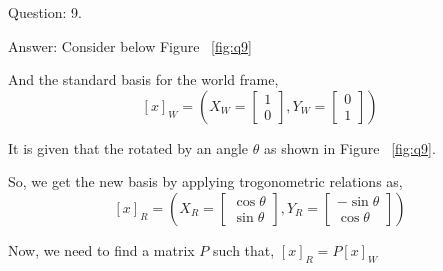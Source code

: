 \documentclass[a4paper]{article}
\begin{document}
\begin{qalist}
		\item[Question: 9.] \setcounter{equation}{0} 
		\item[Answer:]
			Consider below Figure ~\ref{fig:q9} \\
			\begin{minipage}{\linewidth}
				\vspace{0.5cm}
				\centering
				\label{fig:q9}
				\vspace{0.5cm}
			\end{minipage}
			And the standard basis for the world frame, 
			\begin{equation} {[x]}_{W} = 
				\left(
					{X}_{W} = \begin{bmatrix}1 \\ 0\end{bmatrix},
					{Y}_{W} = \begin{bmatrix}0 \\ 1\end{bmatrix}
				\right)
			\end{equation}
			
			It is given that the rotated by an angle $\theta$ as shown in Figure ~\ref{fig:q9}. 
			
			So, we get the new basis by applying trogonometric relations as, 
			\begin{equation} {[x]}_{R} = 
				\left(
					{X}_{R} = \begin{bmatrix}\cos\theta \\ \sin\theta\end{bmatrix},
					{Y}_{R} = \begin{bmatrix}-\sin\theta \\ \cos\theta\end{bmatrix}
				\right)
			\end{equation}
			
			Now, we need to find a matrix $P$ such that,  ${[x]}_{R} = P{[x]}_{W}$
			

\end{qalist}
\end{document}
